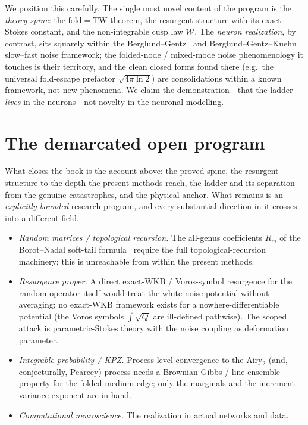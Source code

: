 \documentclass[11pt,reqno]{amsart}
\theoremstyle{plain}
\theoremstyle{definition}
\theoremstyle{remark}
\newcommand{\TW}{\mathrm{TW}}
\newcommand{\W}{\mathcal{W}}
\begin{document}
We position this carefully. The single most novel content of the program is the
\emph{theory spine}: the fold$=\TW$ theorem, the resurgent structure with its exact Stokes constant,
and the non-integrable cusp law $\W$. The \emph{neuron realization}, by contrast, sits squarely
within the Berglund--Gentz~\cite{BG} and Berglund--Gentz--Kuehn~\cite{BGK} slow--fast noise
framework; the folded-node / mixed-mode noise phenomenology it touches is their territory, and the
clean closed forms found there (e.g.\ the universal fold-escape prefactor $\sqrt{4\pi\ln2}$) are
consolidations within a known framework, not new phenomena. We claim the demonstration---that the
ladder \emph{lives} in the neurons---not novelty in the neuronal modelling.

\section{The demarcated open program}\label{sec:open}

What closes the book is the account above: the proved spine, the resurgent structure to the depth the
present methods reach, the ladder and its separation from the genuine catastrophes, and the physical
anchor. What remains is an \emph{explicitly bounded} research program, and every substantial direction
in it crosses into a different field.

\begin{itemize}
\item \emph{Random matrices / topological recursion.} The all-genus coefficients $R_m$ of the
Borot--Nadal soft-tail formula~\cite{BorotNadal} require the full topological-recursion machinery;
this is unreachable from within the present methods.
\item \emph{Resurgence proper.} A direct exact-WKB / Voros-symbol resurgence for the random operator
itself would treat the white-noise potential without averaging; no exact-WKB framework exists for a
nowhere-differentiable potential (the Voros symbols $\int\sqrt Q$ are ill-defined pathwise). The
scoped attack is parametric-Stokes theory with the noise coupling as deformation parameter.
\item \emph{Integrable probability / KPZ.} Process-level convergence to the Airy$_2$ (and,
conjecturally, Pearcey) process needs a Brownian-Gibbs / line-ensemble property for the
folded-medium edge; only the marginals and the increment-variance exponent are in hand.
\item \emph{Computational neuroscience.} The realization in actual networks and data.
\end{itemize}
\end{document}
